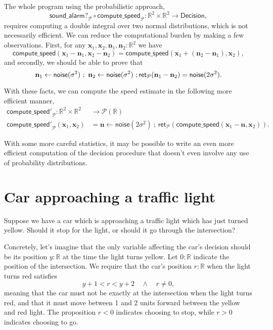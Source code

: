 \documentclass{article}           %
\newcommand{\R}{\mathbb{R}}
\newcommand{\Prob}{\mathcal{P}}
\newcommand{\ret}[1]{\mathsf{ret}_{#1}}
\newcommand{\ve}[1]{\mathbf{#1}}
\newcommand{\then}{\ ;\ }
\begin{document}
The whole program using the probabilistic approach,
\[
\mathsf{sound\_alarm?}_\Prob \circ \mathsf{compute\_speed}_\Prob : \R^2 \times \R^2 \to \mathsf{Decision},
\]
requires computing a double integral over two normal distributions, which is not necessarily efficient. We can reduce the computational burden by making a few observations. First, for any $\ve{x}_1, \ve{x}_2, \ve{n}_1, \ve{n}_2 : \R^2 $ we have
\[
\mathsf{compute\_speed}(\ve{x}_1 - \ve{n}_1, \ve{x}_2 - \ve{n}_2)
= 
\mathsf{compute\_speed}(\ve{x}_1  + (\ve{n}_2 - \ve{n}_1), \ve{x}_2),
\]
and secondly, we should be able to prove that
\[
  \ve{n}_1 \leftarrow \mathsf{noise}(\sigma^2)
  \then
  \ve{n}_2 \leftarrow \mathsf{noise}(\sigma^2)
  \then
  \\ \ret{\Prob}(\ve{n}_1 - \ve{n}_2)
= \mathsf{noise}(2\sigma^2).
\]

With these facts, we can compute the speed estimate in the following more efficient manner,
\begin{align*}
\mathsf{compute\_speed'}_\Prob : \R^2 \times \R^2 &\to \Prob(\R)
\\ \mathsf{compute\_speed'}_\Prob (\ve{x}_1, \ve{x}_2) &= 
  \ve{n} \leftarrow \mathsf{noise}(2 \sigma^2)
  \then
  \ret{\Prob} \left( \mathsf{compute\_speed}(\ve{x}_1 - \ve{n}, \ve{x}_2) \right).
\end{align*}

With some more careful statistics, it may be possible to write an even more efficient computation of the decision procedure that doesn't even involve any use of probability distributions.

\section{Car approaching a traffic light}

Suppose we have a car which is approaching a traffic light which has just turned yellow. Should it stop for the light, or should it go through the intersection?

Concretely, let's imagine that the only variable affecting the car's decision should be its position $y : \R$ at the time the light turns yellow. Let $0 : \R$ indicate the position of the intersection. We require that the car's position $r : \R$ when the light turns red satisfies
\[
y + 1< r < y + 2 \quad \wedge \quad r \ne 0,
\]
meaning that the car must not be exactly at the intersection when the light turns red, and that it must move between 1 and 2 units forward between the yellow and red light. The proposition $r < 0$ indicates choosing to stop, while $r >0$ indicates choosing to go.
\end{document}

